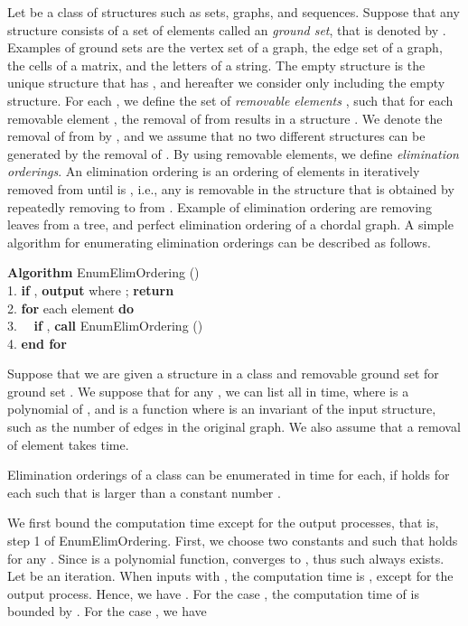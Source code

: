 \documentclass{llncs}
\begin{document}
Let  be a class of structures such as sets, graphs, and sequences.
Suppose that any structure  consists of a set of elements
 called an {\em ground set}, that is denoted by .
Examples of ground sets are the vertex set of a graph, the edge set of 
 a graph, the cells of a matrix, and the letters of a string.
The empty structure  is the unique structure that has
 , and hereafter we consider only  including 
 the empty structure.
For each , we define the set of 
 {\em removable elements} , such that for each removable element
 , the removal of  from  results in a structure
 .
We denote the removal of  from  by , and we assume that
 no two different structures can be generated by the removal of .
By using removable elements, we define {\em elimination orderings}.
An elimination ordering is an ordering  of
 elements in  iteratively removed from  until  is , i.e.,
 any  is removable in the structure  that is obtained by repeatedly 
 removing  to  from .
Example of elimination ordering are removing leaves from a tree,
 and perfect elimination ordering of a chordal graph.
A simple algorithm for enumerating elimination orderings can be described
 as follows.

\begin{tabbing}
{\bf Algorithm} EnumElimOrdering ()\\
1. {\bf if} , {\bf output}  where ;
 {\bf return}\\ 
2. {\bf for} each element  {\bf do}\\
3. \ \ {\bf if} , {\bf call} EnumElimOrdering
 ()\\
4. {\bf end for}
\end{tabbing}

Suppose that we are given a structure  in a class  and
 removable ground set  for ground set .
We suppose that for any , we can list all 
 in  time, where  is a polynomial
 of , and  is a function where  is an invariant of the
 input structure, such as the number of edges in the original graph.
We also assume that a removal of element takes  time.

\begin{theorem}\label{elim}
Elimination orderings of a class  can be enumerated
 in  time for each, if  holds for each 
 such that  is larger than a constant number .
\end{theorem}

\proof
We first bound the computation time except for the output processes, 
 that is, step 1 of EnumElimOrdering.
First, we choose two constants  and  such that 
  holds for any .
Since  is a polynomial function,  converges to
 , thus such  always exists.
Let  be an iteration.
When  inputs  with , the computation time 
 is , except for the output process.
Hence, we have .
For the case , the computation time of  is bounded
 by .
For the case , we have 
\end{document}
